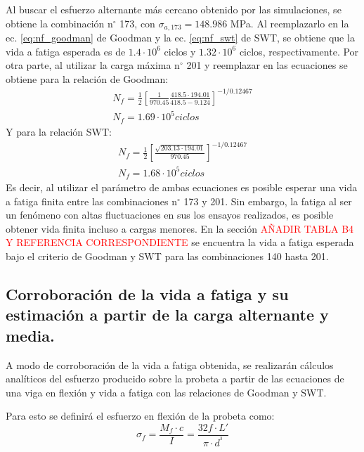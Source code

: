 Al buscar el esfuerzo alternante más cercano obtenido por las simulaciones, se obtiene la combinación n$^{\circ}$ 173, con $\sigma_{a,173} = 148.986$ MPa. Al reemplazarlo en la ec. \ref{eq:nf_goodman} de Goodman y la ec. \ref{eq:nf_swt} de SWT, se obtiene que la vida a fatiga esperada es de $1.4\cdot 10^6$ ciclos y $1.32\cdot 10^6$ ciclos, respectivamente. Por otra parte, al utilizar la carga máxima n$^{\circ}$ 201 y reemplazar en las ecuaciones se obtiene para la relación de Goodman:
\begin{gather*}
	N_f = \frac{1}{2} \left[\frac{1}{970.45} \frac{418.5\cdot 194.01}{418.5 - 9.124}\right]^{-1/0.12467} \\
	N_f = 1.69 \cdot 10^{5} ciclos
\end{gather*}
Y para la relación SWT:
\begin{gather*}
	N_f = \frac{1}{2} \left[\frac{\sqrt{203.13\cdot 194.01}}{970.45} \right]^{-1/0.12467} \\
	N_f = 1.68 \cdot 10^{5} ciclos
\end{gather*}
Es decir, al utilizar el parámetro de ambas ecuaciones es posible esperar una vida a fatiga finita entre las combinaciones n$^{\circ}$ 173 y 201. Sin embargo, la fatiga al ser un fenómeno con altas fluctuaciones en sus los ensayos realizados, es posible obtener vida finita incluso a cargas menores. En la sección \textcolor{red}{AÑADIR TABLA B4 Y REFERENCIA CORRESPONDIENTE} se encuentra la vida a fatiga esperada bajo el criterio de Goodman y SWT para las combinaciones 140 hasta 201.


\subsection{Corroboración de la vida a fatiga y su estimación a partir de la carga alternante y media.}

A modo de corroboración de la vida a fatiga obtenida, se realizarán cálculos analíticos del esfuerzo producido sobre la probeta a partir de las ecuaciones de una viga en flexión y vida a fatiga con las relaciones de Goodman y SWT.

Para esto se definirá el esfuerzo en flexión de la probeta como:
\begin{equation}
	\sigma_f = \frac{M_f \cdot c}{I} = \frac{32 f\cdot L'}{\pi \cdot d^^3}
\end{equation}  


